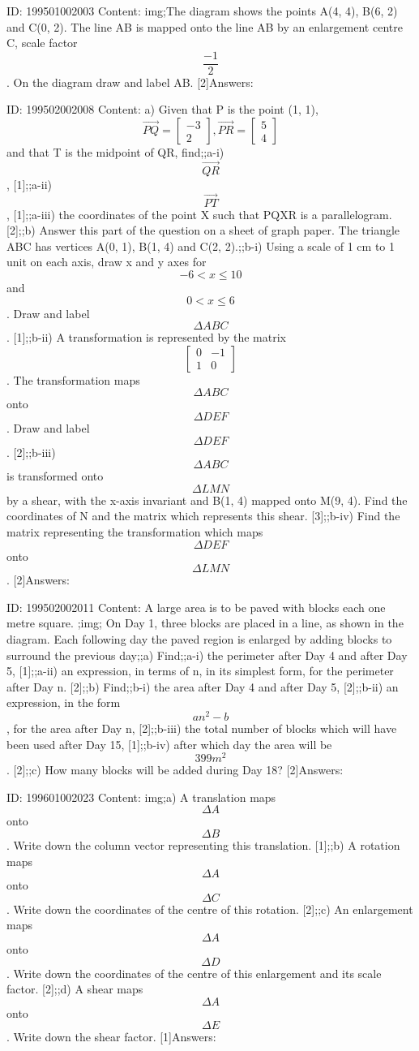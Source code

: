 \documentclass{article}
\begin{document}
ID: 199501002003
Content:
img;The diagram shows the points A(4, 4), B(6, 2) and C(0, 2). The line AB is mapped onto the line AB by an enlargement centre C, scale factor $$\frac{-1}{2}$$. On the diagram draw and label AB. [2]Answers:

ID: 199502002008
Content:
a) Given that P is the point (1, 1), $$\vec{PQ} = \begin{bmatrix}-3\\2\end{bmatrix}, \vec{PR} = \begin{bmatrix}5\\4\end{bmatrix}$$ and that T is the midpoint of QR, find;;a-i) $$\vec{QR}$$, [1];;a-ii) $$\vec{PT}$$, [1];;a-iii) the coordinates of the point X such that PQXR is a parallelogram. [2];;b) Answer this part of the question on a sheet of graph paper. The triangle ABC has vertices A(0, 1), B(1, 4) and C(2, 2).;;b-i) Using a scale of 1 cm to 1 unit on each axis, draw x and y axes for $$-6 < x \leq 10$$ and $$0 < x \leq 6$$. Draw and label $$\Delta ABC$$. [1];;b-ii) A transformation is represented by the matrix $$\begin{bmatrix}0&-1\\1&0\end{bmatrix}$$. The transformation maps $$\Delta ABC$$ onto $$\Delta DEF$$. Draw and label $$\Delta DEF$$. [2];;b-iii) $$\Delta ABC$$ is transformed onto $$\Delta LMN$$ by a shear, with the x-axis invariant and B(1, 4) mapped onto M(9, 4). Find the coordinates of N and the matrix which represents this shear. [3];;b-iv) Find the matrix representing the transformation which maps $$\Delta DEF$$onto $$\Delta LMN$$. [2]Answers:

ID: 199502002011
Content:
A large area is to be paved with blocks each one metre square. ;img; On Day 1, three blocks are placed in a line, as shown in the diagram. Each following day the paved region is enlarged by adding blocks to surround the previous day;;a) Find;;a-i) the perimeter after Day 4 and after Day 5, [1];;a-ii) an expression, in terms of n, in its simplest form, for the perimeter after Day n. [2];;b) Find;;b-i) the area after Day 4 and after Day 5, [2];;b-ii) an expression, in the form $$an^2 - b$$, for the area after Day n, [2];;b-iii) the total number of blocks which will have been used after Day 15, [1];;b-iv) after which day the area will be $$399 m^2$$. [2];;c) How many blocks will be added during Day 18? [2]Answers:

ID: 199601002023
Content:
img;a) A translation maps $$\Delta  A$$ onto $$\Delta  B$$. Write down the column vector representing this translation. [1];;b) A rotation maps $$\Delta  A$$ onto $$\Delta  C$$. Write down the coordinates of the centre of this rotation. [2];;c) An enlargement maps $$\Delta  A$$ onto $$\Delta  D$$. Write down the coordinates of the centre of this enlargement and its scale factor. [2];;d) A shear maps $$\Delta  A$$ onto $$\Delta  E$$. Write down the shear factor. [1]Answers:
\end{document}
